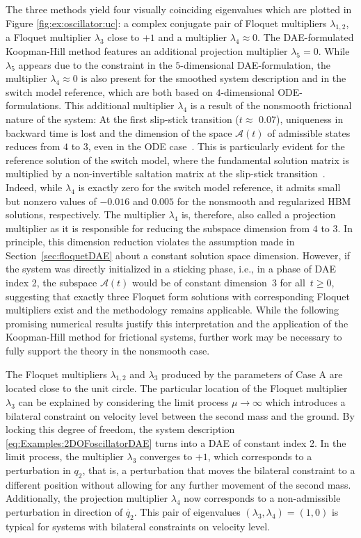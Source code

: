 \documentclass[a4paper, nonatbib, 3p, twocolumn]{elsarticle}
\theoremstyle{plain}
\theoremstyle{definition}
\theoremstyle{remark}
\newcommand{\cA}{\mathcal{A}}
\begin{document}
The three methods yield four visually coinciding eigenvalues which are plotted in Figure \ref{fig:ex:oscillator:uc}: a complex conjugate pair of Floquet multipliers $\lambda_{1,2}$, a Floquet multiplier $\lambda_3$ close to $+1$ and a 
multiplier $\lambda_4 \approx 0$.
The DAE-formulated Koopman-Hill method features an additional projection multiplier $\lambda_5=0$.
While $\lambda_5$ appears due to the constraint in the $5$-dimensional DAE-formulation, the multiplier $\lambda_4 \approx 0$ is also present for the smoothed system description and in the switch model reference, which are both based on $4$-dimensional ODE-formulations.
This additional multiplier $\lambda_4$ is a result of the nonsmooth frictional nature of the system: 
At the first slip-stick transition ($t \approx $ 0.07), uniqueness in backward time is lost and the dimension of the space $\cA(t)$ of admissible states reduces from $4$ to $3$, even in the ODE case~\cite{Leine2004}. 
This is particularly evident for the reference solution of the switch model, where the fundamental solution matrix is multiplied by a non-invertible saltation matrix at the slip-stick transition~\cite{Leine2004}. Indeed, while $\lambda_4$ is exactly zero for the switch model reference, it admits small but nonzero values of $-0.016$ and $0.005$ for the nonsmooth and regularized HBM solutions, respectively. The multiplier $\lambda_4$ is, therefore, also called a projection multiplier as it is responsible for reducing the subspace dimension from $4$ to $3$. 
In principle, this dimension reduction violates the assumption made in Section~\ref{sec:floquetDAE} about a constant solution space dimension.
However, if the system was directly initialized in a sticking phase, i.e., in a phase of DAE index 2, the subspace $\cA(t)$ would be of constant dimension~$3$ for all~$t\geq0$, suggesting that exactly three Floquet form solutions with corresponding Floquet multipliers exist and the methodology remains applicable.
While the following promising numerical results justify this interpretation and the application of the Koopman-Hill method for frictional systems, further work may be necessary to fully support the theory in the nonsmooth case.

The Floquet multipliers $\lambda_{1,2}$ and $\lambda_3$ produced by the parameters of Case A are located close to the unit circle.
The particular location of the Floquet multiplier $\lambda_3$ can be explained by considering the limit process $\mu \to \infty$ which introduces a bilateral constraint on velocity level between the second mass and the ground.
By locking this degree of freedom, the system description \eqref{eq:Examples:2DOFoscillatorDAE} turns into a DAE of constant index 2. In the limit process, the multiplier $\lambda_3$ converges to $+1$, which corresponds to a perturbation in $q_2$, that is, a perturbation that moves the bilateral constraint to a different position without allowing for any further movement of the second mass.
Additionally, the projection multiplier $\lambda_4$ now corresponds to a non-admissible perturbation in direction of $\dot{q_2}$. This pair of eigenvalues $(\lambda_3, \lambda_4) = (1,0)$ is typical for systems with bilateral constraints on velocity level.
\end{document}
